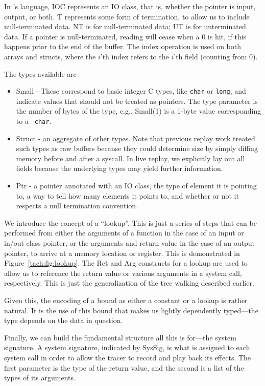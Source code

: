 In \tachyon's language, IOC represents an IO class, that is, whether
the pointer is input, output, or both.  T represents some form of
termination, to allow us to include null-terminated data. NT is for
null-terminated data; UT is for unterminated data. If a pointer is
null-terminated, reading will cease when a 0 is hit, if this happens prior
to the end of the buffer. The index operation is used on both arrays
and structs, where the $i$'th index refers to the $i$'th field
(counting from 0).

The types available are
\begin{itemize}
\item Small - These correspond to basic integer C types, like
  \texttt{char} or \texttt{long}, and indicate values that should not
  be treated as pointers. The type parameter is the number of bytes of
  the type, e.g., Small(1) is a 1-byte value corresponding to a {\tt
    char}.

\item Struct - an aggregate of other types. Note that previous replay
  work treated such types as raw buffers because they could determine
  size by simply diffing memory before and after a syscall.  In live
  replay, we explicitly lay out all fields because the underlying
  types may yield further information.

\item Ptr - a pointer  annotated with an IO class, the type of
  element it is pointing to, a way to tell how many elements it points
  to, and whether or not it respects a null termination convention.
\end{itemize}

We introduce the concept
of a ``lookup''. This is just a series of steps that can be performed
from either the arguments of a function in the case of an input or
in/out class pointer, or the arguments and return value in the case of
an output pointer, to arrive at a memory location or register. This is
demonstrated in Figure~\ref{tach:fig:lookup}. The Ret and Arg
constructs for a lookup are used to allow us to reference the return
value or various arguments in a system call, respectively.  This is
just the generalization of the tree walking described earlier.

Given this, the encoding of a bound as either a constant or a lookup
is rather natural. It is the use of this bound that makes us lightly
dependently typed---the type depends on the data in question.

Finally, we can build the fundamental structure all this is for---the
system signature.  A system signature, indicated by SysSig, is what is
assigned to each system call in order to allow the tracer to
record and play back its effects. The first parameter is the type of
the return value, and the second is a list of the types of its
arguments.


